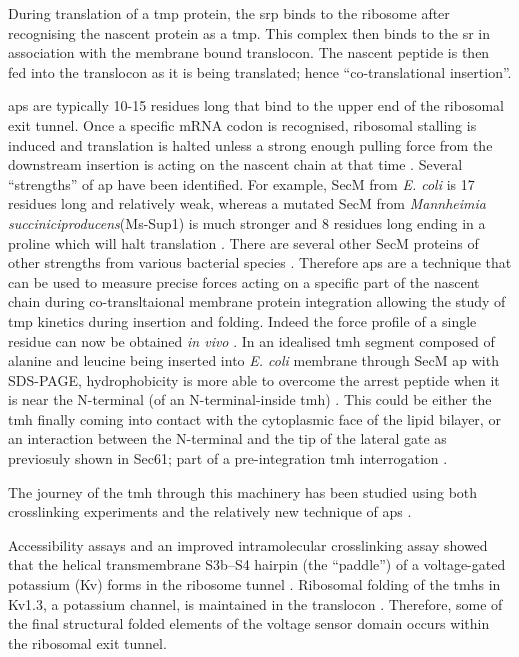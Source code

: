 During translation of a \gls{tmp} protein, the \gls{srp} binds to the ribosome after recognising the nascent protein as a \gls{tmp}.
This complex then binds to the \gls{sr} in association with the membrane bound translocon.
The nascent peptide is then fed into the translocon as it is being translated; hence ``co-translational insertion''.

\gls{ap}s are typically 10-15 residues long that bind to the upper end of the ribosomal exit tunnel.
Once a specific mRNA codon is recognised, ribosomal stalling is induced \cite{Ito2010} and translation is halted unless a strong enough pulling force from the downstream insertion is acting on the nascent chain at that time \cite{Butkus2013}.
Several ``strengths'' of \gls{ap} have been identified.
For example, SecM from \textit{E. coli} is 17 residues long and relatively weak, whereas a mutated SecM from \textit{Mannheimia succiniciproducens}(Ms-Sup1) is much stronger and 8 residues long ending in a proline which will halt translation \cite{Ismail2012}.
There are several other SecM proteins of other strengths from various bacterial species \cite{Yap2009}.
Therefore \gls{ap}s are a technique that can be used to measure precise forces acting on a specific part of the nascent chain during co-transltaional membrane protein integration allowing the study of \gls{tmp} kinetics during insertion and folding.
Indeed the force profile of a single residue can now be obtained \textit{in vivo} \cite{Ismail2012}.
In an idealised \gls{tmh} segment composed of alanine and leucine being inserted into \textit{E. coli} membrane through SecM \gls{ap} with SDS-PAGE, hydrophobicity is more able to overcome the arrest peptide when it is near the N-terminal (of an N-terminal-inside \gls{tmh}) \cite{Ismail2012}.
This could be either the \gls{tmh} finally coming into contact with the cytoplasmic face of the lipid bilayer, or an interaction between the N-terminal and the tip of the lateral gate as previosuly shown in Sec61; part of a pre-integration \gls{tmh} interrogation \cite{MacKinnon2014}.

The journey of the \gls{tmh} through this machinery has been studied using both crosslinking experiments and the relatively new technique of \gls{ap}s \cite{Cymer2014}.

Accessibility assays and an improved intramolecular crosslinking assay showed that the helical transmembrane S3b–S4 hairpin (the “paddle”) of a voltage-gated potassium (Kv) forms in the ribosome tunnel \cite{Tu2014}.
Ribosomal folding of the \gls{tmh}s in Kv1.3, a potassium channel, is maintained in the translocon \cite{Tu2010}.
Therefore, some of the final structural folded elements of the voltage sensor domain occurs within the ribosomal exit tunnel.

